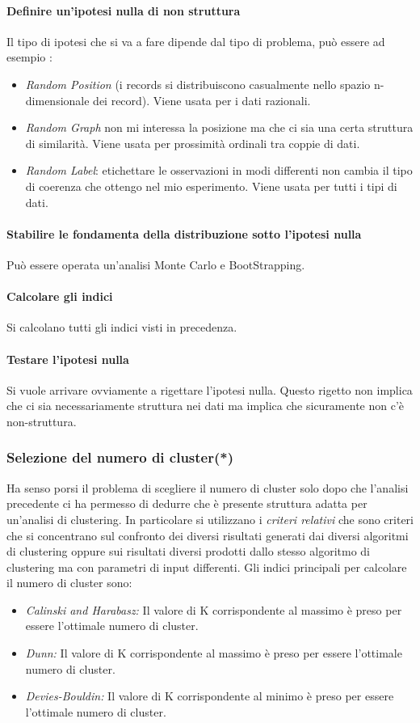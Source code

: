  \paragraph{Definire un'ipotesi nulla di non struttura} Il tipo di ipotesi che si va a fare dipende dal tipo di problema, può essere ad esempio :
 \begin{itemize}
 	\item \textit{Random Position} (i records si distribuiscono casualmente nello spazio n-dimensionale dei record). Viene usata per i dati razionali.
 	\item \textit{Random Graph } non mi interessa la posizione ma che ci sia una certa struttura di similarità. Viene usata per prossimità ordinali tra coppie di dati.
 	\item \textit{Random Label}: etichettare le osservazioni in modi differenti non cambia il tipo di coerenza che ottengo nel mio esperimento. Viene usata per tutti i tipi di dati.
 \end{itemize}
\paragraph{Stabilire le fondamenta della distribuzione sotto l'ipotesi nulla} Può essere operata un'analisi Monte Carlo e BootStrapping.
\paragraph{Calcolare gli indici} Si calcolano tutti gli indici visti in precedenza.
\paragraph{Testare l'ipotesi nulla} Si vuole arrivare ovviamente a rigettare l'ipotesi nulla. Questo rigetto non implica che ci sia necessariamente struttura nei dati ma implica che sicuramente non c'è non-struttura. 
 
 \subsubsection{Selezione del numero di cluster(*)}
 Ha senso porsi il problema di scegliere il numero di cluster solo dopo che l'analisi precedente ci ha permesso di dedurre che è presente struttura adatta per un'analisi di clustering. In particolare si utilizzano i \textit{criteri relativi} che sono criteri che si concentrano sul confronto dei diversi risultati generati dai diversi algoritmi di clustering oppure sui risultati diversi prodotti dallo stesso algoritmo di clustering ma con parametri di input differenti.
 Gli indici principali per calcolare il numero di cluster sono:
 \begin{itemize}
 	\item \textit{Calinski and Harabasz:} Il valore di K corrispondente al massimo è preso per essere l'ottimale numero di cluster.
 	\item \textit{Dunn:} Il valore di K corrispondente al massimo è preso per essere l'ottimale numero di cluster.
 	\item \textit{Devies-Bouldin:} Il valore di K corrispondente al minimo è preso per essere l'ottimale numero di cluster.
 \end{itemize}
 
